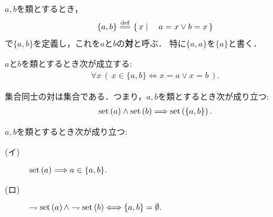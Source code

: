 	\begin{screen}
		\begin{dfn}[対]
			$a,b$を類とするとき，
			\begin{align}
				\{a,b\} \defeq \Set{x}{a = x \vee b = x}
			\end{align}
			で$\{a,b\}$を定義し，これを$a$と$b$の{\bf 対}と呼ぶ．
			特に$\{a,a\}$を$\{a\}$と書く．
		\end{dfn}
	\end{screen}
	
	\begin{screen}
		\begin{thm}[対は表示されている要素しか持たない]
		\label{thm:pair_members_are_exactly_the_given_two}
			$a$と$b$を類とするとき次が成立する:
			\begin{align}
				\forall x\, (\, x \in \{a,b\} \Longleftrightarrow x=a \vee x=b\, ).
			\end{align}
		\end{thm}
	\end{screen}
	
	\begin{screen}
		\begin{axm}[対の公理]
			集合同士の対は集合である．つまり，$a,b$を類とするとき次が成り立つ:
			\begin{align}
				\operatorname*{set} \left(a\right) \wedge \operatorname*{set} \left(b\right) \Longrightarrow 
				\operatorname*{set} \left(\{a,b\}\right).
			\end{align}
		\end{axm}
	\end{screen}
	
	\begin{screen}
		\begin{thm}[真類の対は空]
		\label{thm:pair_of_proper_classes_is_emptyset}
			$a,b$を類とするとき次が成り立つ:
			\begin{description}
				\item[(イ)] $\operatorname*{set} \left(a\right) \Longrightarrow a \in \{a,b\}.$
				
				\item[(ロ)] $\rightharpoondown \operatorname*{set} \left(a\right) \wedge \rightharpoondown \operatorname*{set} \left(b\right) \Longleftrightarrow \{a,b\} = \emptyset.$
			\end{description}
		\end{thm}
	\end{screen}
	
